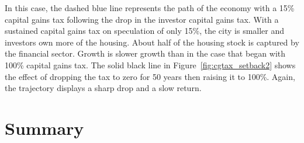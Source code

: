 In this case, the dashed blue line represents the path of the economy with a 15\% capital gains tax following the drop in the investor capital gains tax. %
With a sustained capital gains tax on speculation of only 15\%, the city is smaller and investors own more of the housing. About half of the housing stock is captured by the financial sector. 
Growth is slower growth than in the case that began with 100\% capital gains tax. %
The solid black line in Figure~\ref{fig:cgtax_setback2} shows the %
effect of dropping the tax to zero for 50 years then raising it to 100\%. Again, the trajectory displays a sharp drop and a slow return.  







\section{Summary}


